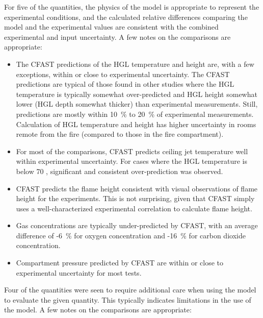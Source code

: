 For five of the quantities,  the physics of the model is appropriate to represent the experimental conditions, and the calculated relative differences comparing the model and the experimental values are consistent with the combined experimental and input uncertainty.  A few notes on the comparisons are appropriate:

\begin{itemize}
\item The CFAST predictions of the HGL temperature and height are, with a few exceptions, within or close to experimental uncertainty.  The CFAST predictions are typical of those found in other studies where the HGL temperature is typically somewhat over-predicted and HGL height somewhat lower (HGL depth somewhat thicker) than experimental measurements.  Still, predictions are mostly within 10~\% to 20~\% of experimental measurements.  Calculation of HGL temperature and height has higher uncertainty in rooms remote from the fire (compared to those in the fire compartment).
\item For most of the comparisons, CFAST predicts ceiling jet temperature well within experimental uncertainty.  For cases where the HGL temperature is below 70 \degc, significant and consistent over-prediction was observed.
\item CFAST predicts the flame height consistent with visual observations of flame height for the experiments.  This is not surprising, given that CFAST simply uses a well-characterized experimental correlation to calculate flame height.
\item Gas concentrations are typically under-predicted by CFAST, with an average difference of -6~\% for oxygen concentration and -16~\% for carbon dioxide concentration. 
\item Compartment pressure predicted by CFAST are within or close to experimental uncertainty for most tests.
\end{itemize}


Four of the quantities were seen to require additional care when using the model to evaluate the given quantity.  This typically indicates limitations in the use of the model.  A few notes on the comparisons are appropriate:

